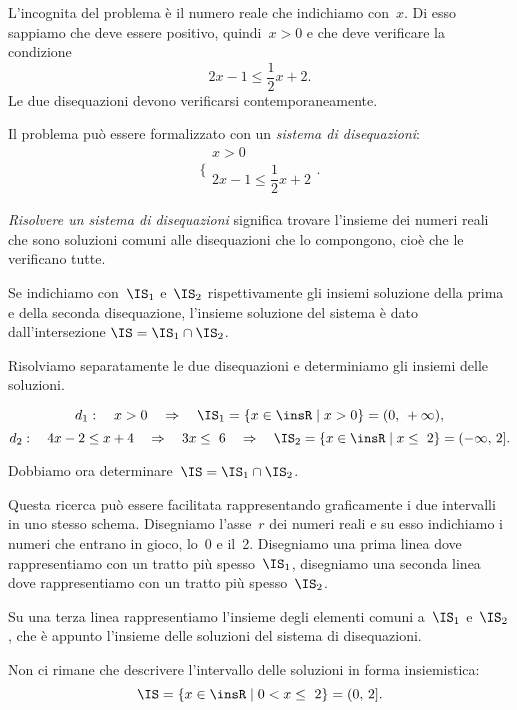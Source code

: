 \begin{soluzione}
 L'incognita del problema è il numero reale che indichiamo con~$x$. Di esso
sappiamo che deve essere positivo, quindi~$x>0$ e che deve verificare
la condizione
\[2x-1\le \frac{1}{2}x+2.\]
Le due disequazioni devono
verificarsi contemporaneamente.

Il problema può essere formalizzato con un \emph{sistema di disequazioni}:
\[\bigg \{%
\begin{array}{l}
 x>0\\
 2x-1\le\dfrac{1}{2}x+2
\end{array}.\]



\emph{Risolvere un sistema di disequazioni} significa trovare
l'insieme dei numeri reali che sono soluzioni comuni
alle disequazioni che lo compongono, cioè che le verificano tutte.

Se indichiamo con~$\IS_{1}$ e~$\IS_{2}$
rispettivamente gli insiemi soluzione della prima e della seconda
disequazione, l'insieme soluzione del sistema è dato
dall'intersezione
$\IS=\IS_{1}\cap\IS_{2}$.

Risolviamo separatamente le due disequazioni e determiniamo gli
insiemi delle soluzioni.

\[d_1:\quad x>0\quad\Rightarrow\quad \IS_{1}=\{x\in\insR\mid x>0\}=(0\text{,~}+\infty)\text{,}\]
\[d_2:\quad 4x-2\le x+4\quad\Rightarrow\quad 3x\le~6\quad\Rightarrow\quad\IS_{2}=\{x\in \insR\mid x\le~2\}=(-\infty\text{,~}2].\]

Dobbiamo ora determinare~$\IS=\IS_{1}\cap\IS_{2}$.

Questa ricerca può essere facilitata rappresentando graficamente i due
intervalli in uno stesso schema. Disegniamo l'asse~$r$ dei
numeri reali e su esso indichiamo i numeri che entrano in gioco, lo~0
e il~2. Disegniamo una prima linea dove rappresentiamo con un tratto più
spesso~$\IS_{1}$, disegniamo una seconda linea dove
rappresentiamo con un tratto più spesso~$\IS_2$.

Su una terza linea rappresentiamo l'insieme degli
elementi comuni a~$\IS_{1}$ e~$\IS_{2}$, che
è appunto l'insieme delle soluzioni del sistema di
disequazioni.
\begin{center}
 
\end{center}

Non ci rimane che descrivere
l'intervallo delle soluzioni in forma insiemistica:
\[\IS=\{x\in \insR\mid 0<x\le~2\}=(0\text{,~}2].\]

\end{soluzione}

